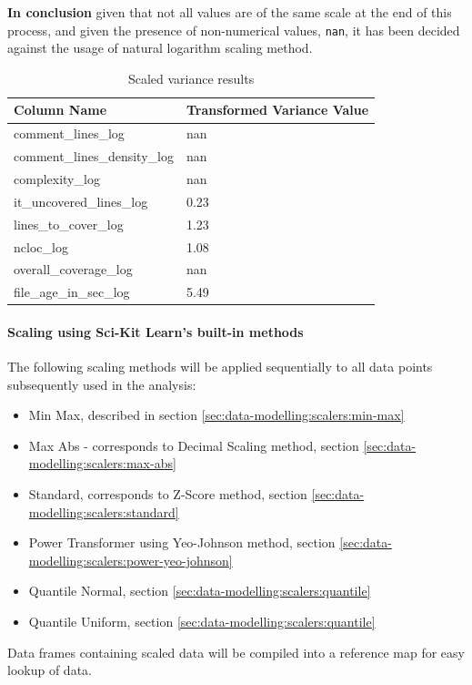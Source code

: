 \textbf{In conclusion} given that not all values are of the same scale at the end of this process, and given the presence of non-numerical values, \texttt{nan}, it has been decided against the usage of natural logarithm scaling method.
\begin{table}[!h]
\centering
\caption{Scaled variance results}
\label{tbl:loge-scaler-cols-transformed}
\begin{tabular}{@{}ll@{}}
\toprule
Column Name & Transformed Variance Value \\ \midrule
comment\_lines\_log & nan \\
comment\_lines\_density\_log & nan \\
complexity\_log & nan \\
it\_uncovered\_lines\_log & 0.23 \\
lines\_to\_cover\_log & 1.23 \\
ncloc\_log & 1.08 \\
overall\_coverage\_log & nan \\
file\_age\_in\_sec\_log & 5.49 \\ \bottomrule
\end{tabular}
\end{table}


\paragraph{Scaling using Sci-Kit Learn's built-in methods}
The following scaling methods will be applied sequentially to all data points subsequently used in the analysis:
\begin{itemize}\label{lst:list-of-scalers}
    \item Min Max, described in section \ref{sec:data-modelling:scalers:min-max}
    \item Max Abs - corresponds to Decimal Scaling method, section \ref{sec:data-modelling:scalers:max-abs}
    \item Standard, corresponds to Z-Score method, section \ref{sec:data-modelling:scalers:standard}
    \item Power Transformer using Yeo-Johnson method, section \ref{sec:data-modelling:scalers:power-yeo-johnson}
    \item Quantile Normal, section \ref{sec:data-modelling:scalers:quantile}
    \item Quantile Uniform, section \ref{sec:data-modelling:scalers:quantile}
\end{itemize}

Data frames containing scaled data will be compiled into a reference map for easy lookup of data.


